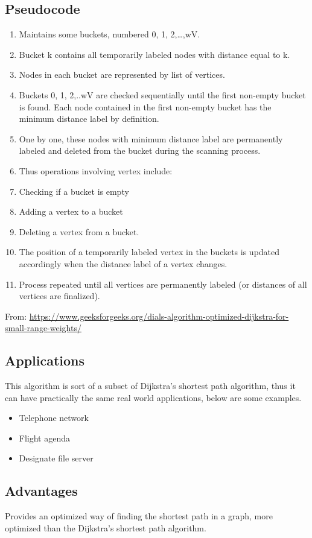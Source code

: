 \documentclass{article}
\begin{document}
\subsection{Pseudocode} 
\begin{enumerate}
    \item Maintains some buckets, numbered 0, 1, 2,…,wV.
    \item Bucket k contains all temporarily labeled nodes with distance equal to k.
    \item Nodes in each bucket are represented by list of vertices.
    \item Buckets 0, 1, 2,..wV are checked sequentially until the first non-empty bucket is found. Each node contained in the first non-empty bucket has the minimum distance label by definition.
    \item One by one, these nodes with minimum distance label are permanently labeled and deleted from the bucket during the scanning process.
    \item Thus operations involving vertex include:
    \item Checking if a bucket is empty
    \item Adding a vertex to a bucket
    \item Deleting a vertex from a bucket.
    \item The position of a temporarily labeled vertex in the buckets is updated accordingly when the distance label of a vertex changes.
    \item Process repeated until all vertices are permanently labeled (or distances of all vertices are finalized).
\end{enumerate}
From: \url{https://www.geeksforgeeks.org/dials-algorithm-optimized-dijkstra-for-small-range-weights/}

\subsection{Applications}
This algorithm is sort of a subset of Dijkstra's shortest path algorithm, thus it can have practically the same real world applications, below are some examples.
\begin{itemize}
    \item Telephone network 
    \item Flight agenda 
    \item Designate file server
\end{itemize}

\subsection{Advantages}
Provides an optimized way of finding the shortest path in a graph, more optimized than the Dijkstra's shortest path algorithm.
\end{document}
